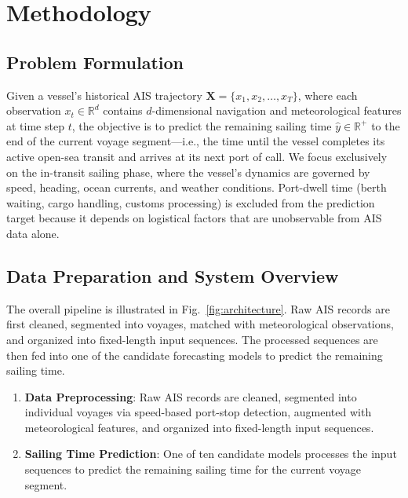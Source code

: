 \documentclass[sigconf,anonymous]{acmart}%
\begin{document}
\section{Methodology}

\subsection{Problem Formulation}

Given a vessel's historical AIS trajectory $\mathbf{X} = \{x_1, x_2, \ldots, x_T\}$, where each observation $x_t \in \mathbb{R}^{d}$ contains $d$-dimensional navigation and meteorological features at time step $t$, the objective is to predict the remaining sailing time $\hat{y} \in \mathbb{R}^{+}$ to the end of the current voyage segment---i.e., the time until the vessel completes its active open-sea transit and arrives at its next port of call.
We focus exclusively on the in-transit sailing phase, where the vessel's dynamics are governed by speed, heading, ocean currents, and weather conditions. Port-dwell time (berth waiting, cargo handling, customs processing) is excluded from the prediction target because it depends on logistical factors that are unobservable from AIS data alone.



\subsection{Data Preparation and System Overview}
\label{sec:voyage_extraction}
The overall pipeline is illustrated in Fig.~\ref{fig:architecture}. Raw AIS records are first cleaned, segmented into voyages, matched with meteorological observations, and organized into fixed-length input sequences. The processed sequences are then fed into one of the candidate forecasting models to predict the remaining sailing time.

\begin{enumerate}
    \item \textbf{Data Preprocessing}: Raw AIS records are cleaned, segmented into individual voyages via speed-based port-stop detection, augmented with meteorological features, and organized into fixed-length input sequences.
    \item \textbf{Sailing Time Prediction}: One of ten candidate models processes the input sequences to predict the remaining sailing time for the current voyage segment.
\end{enumerate}
\end{document}
